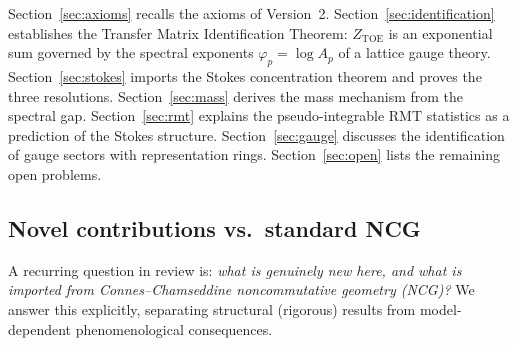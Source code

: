 \documentclass[12pt]{article}
\theoremstyle{definition}
\theoremstyle{remark}
\newcommand{\TOE}{\mathrm{TOE}}
\begin{document}
Section~\ref{sec:axioms} recalls the axioms of Version~2.
Section~\ref{sec:identification} establishes the Transfer Matrix
Identification Theorem: $Z_\TOE$ is an exponential sum governed by
the spectral exponents $\varphi_p = \log A_p$ of a lattice gauge theory.
Section~\ref{sec:stokes} imports the Stokes concentration theorem
and proves the three resolutions.
Section~\ref{sec:mass} derives the mass mechanism from the spectral gap.
Section~\ref{sec:rmt} explains the pseudo-integrable RMT statistics
as a prediction of the Stokes structure.
Section~\ref{sec:gauge} discusses the identification of gauge
sectors with representation rings.
Section~\ref{sec:open} lists the remaining open problems.

\subsection*{Novel contributions vs.\ standard NCG}

A recurring question in review is: \emph{what is genuinely new here, and what
is imported from Connes--Chamseddine noncommutative geometry (NCG)?}
We answer this explicitly, separating structural (rigorous) results from
model-dependent phenomenological consequences.
\end{document}

